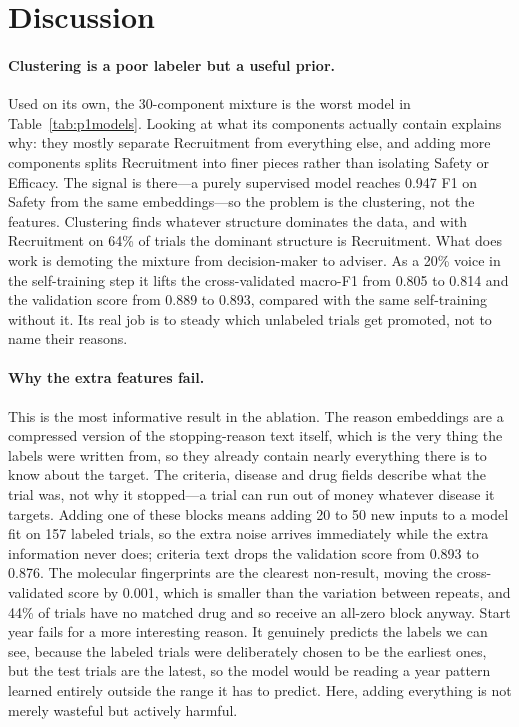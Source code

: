 \section{Discussion}
\label{sec:discussion}

\paragraph{Clustering is a poor labeler but a useful prior.}
Used on its own, the 30-component mixture is the worst model in
Table~\ref{tab:p1models}. Looking at what its components actually contain explains
why: they mostly separate Recruitment from everything else, and adding more
components splits Recruitment into finer pieces rather than isolating Safety or
Efficacy. The signal is there---a purely supervised model reaches 0.947 F1 on
Safety from the same embeddings---so the problem is the clustering, not the
features. Clustering finds whatever structure dominates the data, and with
Recruitment on 64\% of trials the dominant structure is Recruitment. What does
work is demoting the mixture from decision-maker to adviser. As a 20\% voice in
the self-training step it lifts the cross-validated macro-F1 from 0.805 to 0.814
and the validation score from 0.889 to 0.893, compared with the same self-training
without it. Its real job is to steady which unlabeled trials get promoted, not to
name their reasons.

\paragraph{Why the extra features fail.}
This is the most informative result in the ablation. The reason embeddings are a
compressed version of the stopping-reason text itself, which is the very thing the
labels were written from, so they already contain nearly everything there is to
know about the target. The criteria, disease and drug fields describe what the
trial was, not why it stopped---a trial can run out of money whatever disease it
targets. Adding one of these blocks means adding 20 to 50 new inputs to a model
fit on 157 labeled trials, so the extra noise arrives immediately while the extra
information never does; criteria text drops the validation score from 0.893 to
0.876. The molecular fingerprints are the clearest non-result, moving the
cross-validated score by 0.001, which is smaller than the variation between
repeats, and 44\% of trials have no matched drug and so receive an all-zero block
anyway. Start year fails for a more interesting reason. It genuinely predicts the
labels we can see, because the labeled trials were deliberately chosen to be the
earliest ones, but the test trials are the latest, so the model would be reading a
year pattern learned entirely outside the range it has to predict. Here, adding
everything is not merely wasteful but actively harmful.

